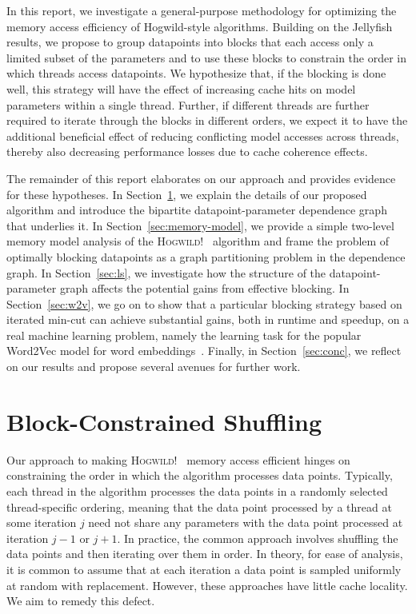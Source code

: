 \documentclass[times,11pt]{article}
\numberwithin{equation}{section}		%
\numberwithin{figure}{section}			%
\numberwithin{table}{section}				%
\newcommand{\HW}{\textsc{Hogwild!}}
\begin{document}
In this report, we investigate a general-purpose methodology for optimizing the memory access efficiency of Hogwild-style algorithms. Building on the Jellyfish results, we propose to group datapoints into blocks that each access only a 
limited subset of the parameters and to use these blocks to constrain the order in which threads access datapoints. We hypothesize that, if the blocking is done well, this strategy will have the effect of increasing cache hits on model parameters within a single thread.
Further, if different threads are further required to iterate through the blocks in different orders, we expect it to have the additional beneficial effect of reducing conflicting model accesses across threads, thereby also decreasing performance losses due to cache coherence effects.

The remainder of this report elaborates on our approach and provides evidence for these hypotheses. In Section~\ref{sec:alg-spec}, we explain the details of our proposed algorithm and introduce the bipartite datapoint-parameter dependence graph that underlies it. In Section~\ref{sec:memory-model}, we provide a simple 
two-level memory model analysis of the \HW~ algorithm and frame the problem of optimally blocking datapoints as a graph partitioning problem in the dependence graph. In Section~\ref{sec:ls}, we investigate how the structure of the datapoint-parameter graph affects the potential gains from 
effective blocking. In Section~\ref{sec:w2v}, we go on to show that a particular blocking strategy based on iterated min-cut can achieve substantial gains, both in runtime and speedup, on a real machine learning problem, namely the learning task for the popular Word2Vec model for word embeddings~\citep{arora2015rand}. Finally, in 
Section~\ref{sec:conc}, we reflect on our results and propose several avenues for further work.

\section{Block-Constrained Shuffling}\label{sec:alg-spec}

Our approach to making \HW~ memory access efficient hinges on constraining the order in which the algorithm processes data points. Typically, each thread
in the algorithm processes the data points in a randomly selected thread-specific ordering, meaning that the data
point processed by a thread at some iteration $j$ need not share any parameters with the data point processed at iteration $j - 1$ or $j + 1$. In practice, the 
common approach involves shuffling the data points and then iterating over them in order. In theory, for ease of analysis, it is common to assume that at each iteration
a data point is sampled uniformly at random with replacement. 
However, these approaches have little cache locality. We aim to remedy this defect.
\end{document}
